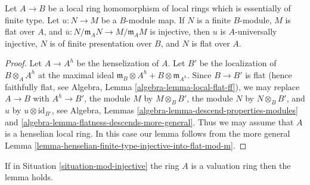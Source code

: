 \begin{lemma}
\label{lemma-upstairs-finite-type-injective-into-flat-mod-m}
Let $A \to B$ be a local ring homomorphism of local rings which is
essentially of finite type. Let $u : N \to M$ be a $B$-module map.
If $N$ is a finite $B$-module, $M$ is flat over $A$, and
$\overline{u} : N/\mathfrak m_A N \to M/\mathfrak m_A M$ is injective,
then $u$ is $A$-universally injective, $N$ is of finite presentation over
$B$, and $N$ is flat over $A$.
\end{lemma}

\begin{proof}
Let $A \to A^h$ be the henselization of $A$. Let $B'$ be the localization
of $B \otimes_A A^h$ at the maximal ideal
$\mathfrak m_B \otimes A^h + B \otimes \mathfrak m_{A^h}$.
Since $B \to B'$ is flat (hence faithfully flat, see
Algebra, Lemma \ref{algebra-lemma-local-flat-ff}),
we may replace $A \to B$ with $A^h \to B'$,
the module $M$ by $M \otimes_B B'$, the module $N$ by $N \otimes_B B'$,
and $u$ by $u \otimes \text{id}_{B'}$, see
Algebra, Lemmas \ref{algebra-lemma-descend-properties-modules} and
\ref{algebra-lemma-flatness-descends-more-general}.
Thus we may assume that $A$ is a henselian local ring.
In this case our lemma follows from the more general
Lemma \ref{lemma-henselian-finite-type-injective-into-flat-mod-m}.
\end{proof}

\begin{lemma}
\label{lemma-valuation-ring-finite-type-injective-into-flat-mod-m}
If in Situation \ref{situation-mod-injective} the ring $A$ is a
valuation ring then the lemma holds.
\end{lemma}

